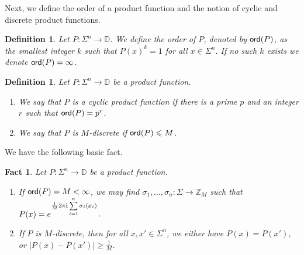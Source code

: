 \documentclass[10pt,a4paper]{amsart}
\newtheorem{fact}[thm]{Fact}
\newtheorem{definition}[thm]{Definition}
\newcommand\card[1]{\left| {#1} \right|}
\renewcommand\geq{\geqslant}
\renewcommand\leq{\leqslant}
\begin{document}
Next, we define the order of a product function and the notion of cyclic and discrete product functions.
\begin{definition}
    Let $P\colon \Sigma^{n}\to\mathbb{D}$. We define the order of $P$, denoted by ${\sf ord}(P)$, as the smallest integer $k$ such that $P(x)^{k}= 1$ for all $x\in\Sigma^n$. If no such $k$ exists we denote ${\sf ord}(P) = \infty$.
\end{definition}
\begin{definition}
    Let $P\colon \Sigma^n\to\mathbb{D}$ be a product function.
    \begin{enumerate}
        \item We say that $P$ is a cyclic product function if there is a prime $p$ and an integer $r$ such that ${\sf ord}(P) = p^r$. 
        \item We say that $P$ is $M$-discrete if ${\sf ord}(P)\leq M$.
    \end{enumerate}
\end{definition}
We have the following basic fact.
\begin{fact}\label{fact:triv_disc_cyclic}
    Let $P\colon \Sigma^n\to\mathbb{D}$ be a product function.
    \begin{enumerate}
        \item If ${\sf ord}(P)=M<\infty$, we may find $\sigma_1,\ldots,\sigma_n\colon \Sigma\to \mathbb{Z}_{M}$ such that $P(x) = e^{\frac{1}{M}2\pi{\bf i}\sum\limits_{i=1}^{n}\sigma_i(x_i)}$.
        \item If $P$ is $M$-discrete, then for all $x,x'\in\Sigma^n$, we either have $P(x)=P(x')$, or $\card{P(x)-P(x')}\geq \frac{1}{M}$.
    \end{enumerate}
\end{fact}
\end{document}
